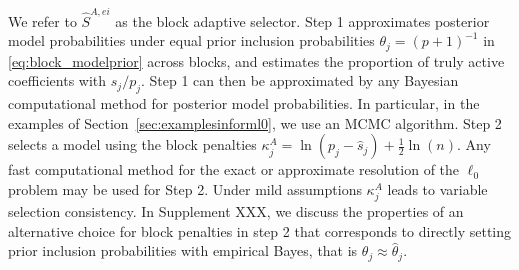 \documentclass[
  12pt]{article}
\newcommand{\bX}{\mathbf{X}}
\newtheorem{thm}{\textsc{Theorem}}[section]
\begin{document}
We refer to $\hat{S}^{A,ei}$ as the block adaptive selector. Step 1 approximates posterior model probabilities under equal prior inclusion probabilities $\theta_j=(p+1)^{-1}$ in \eqref{eq:block_modelprior} across blocks, and estimates the proportion of truly active coefficients with $\hat{s}_j/p_j$. Step 1 can then be approximated by any Bayesian computational method for posterior model probabilities. In particular, in the examples of Section~\ref{sec:examplesinforml0}, we use an MCMC algorithm. Step 2 selects a model using the block penalties 
$\kappa_j^{A}= \ln(p_j-\hat{s}_j)+ \tfrac{1}{2}\ln(n)$. Any fast computational method for the exact or approximate resolution of the $\ell_0$ problem may be used for Step 2. Under mild assumptions $\kappa_j^{A}$ leads to variable selection consistency. In Supplement XXX, we discuss the properties of an alternative choice for block penalties in step 2 that corresponds to directly setting prior inclusion probabilities with empirical Bayes, that is $\theta_j\approx\hat\theta_j$.


%
\end{document}
